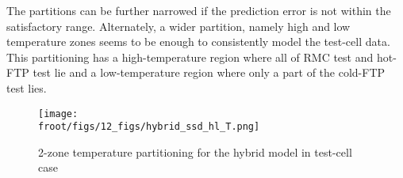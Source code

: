 The partitions can be further narrowed if the prediction error is not within the satisfactory range. Alternately, a wider partition, namely high and low temperature zones seems to be enough to consistently model the test-cell data. This partitioning has a high-temperature region where all of RMC test and hot-FTP test lie and a low-temperature region where only a part of the cold-FTP test lies.

\begin{figure}[H]
        \centering
        \texttt{[image: \\froot/figs/12\_figs/hybrid\_ssd\_hl\_T.png]}
        \caption{2-zone temperature partitioning for the hybrid model in test-cell case}
\end{figure}
